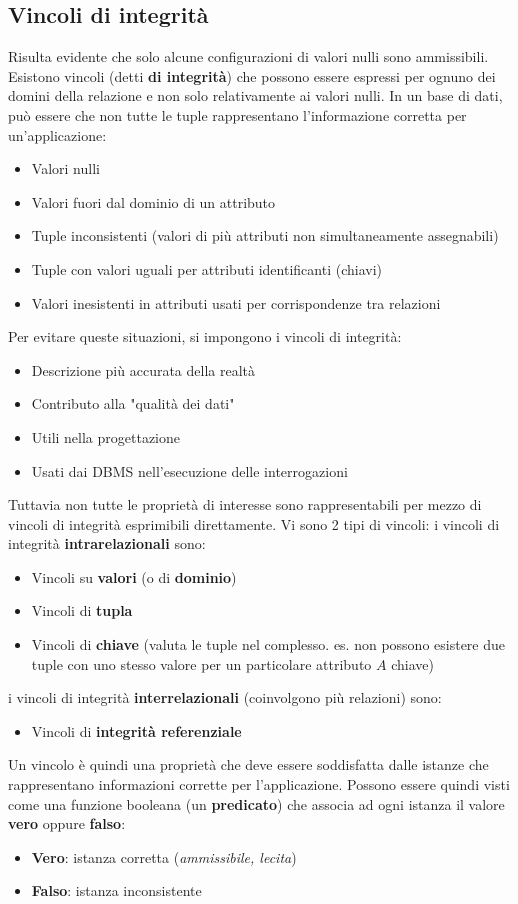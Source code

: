 \documentclass[12pt]{article}
\begin{document}
\subsection{Vincoli di integrità}
Risulta evidente che solo alcune configurazioni di valori nulli sono ammissibili.
Esistono vincoli (detti \textbf{di integrità}) che possono essere espressi per ognuno dei domini della relazione e non solo relativamente ai valori nulli.
In un base di dati, può essere che non tutte le tuple rappresentano l'informazione corretta per un'applicazione:
\begin{itemize}
    \item Valori nulli
    \item Valori fuori dal dominio di un attributo
    \item Tuple inconsistenti (valori di più attributi non simultaneamente assegnabili)
    \item Tuple con valori uguali per attributi identificanti (chiavi)
    \item Valori inesistenti in attributi usati per corrispondenze tra relazioni
\end{itemize}
Per evitare queste situazioni, si impongono i vincoli di integrità:
\begin{itemize}
    \item Descrizione più accurata della realtà 
    \item Contributo alla "qualità dei dati"
    \item Utili nella progettazione
    \item Usati dai DBMS nell'esecuzione delle interrogazioni
\end{itemize}
Tuttavia non tutte le proprietà di interesse sono rappresentabili per mezzo di vincoli di integrità esprimibili direttamente. \newline
Vi sono 2 tipi di vincoli: i vincoli di integrità \textbf{intrarelazionali} sono:
\begin{itemize}
    \item Vincoli su \textbf{valori} (o di \textbf{dominio})
    \item Vincoli di \textbf{tupla}
    \item Vincoli di \textbf{chiave} (valuta le tuple nel complesso. es. non possono esistere due tuple con uno stesso valore per un particolare attributo $A$ chiave)
\end{itemize}
i vincoli di integrità \textbf{interrelazionali} (coinvolgono più relazioni) sono:
\begin{itemize}
    \item Vincoli di \textbf{integrità referenziale}
\end{itemize} 
Un vincolo è quindi una proprietà che deve essere soddisfatta dalle istanze che rappresentano informazioni corrette per l'applicazione.
Possono essere quindi visti come una funzione booleana (un \textbf{predicato}) che associa ad ogni istanza il valore \textbf{vero} oppure \textbf{falso}:
\begin{itemize}
    \item \textbf{Vero}: istanza corretta (\textit{ammissibile, lecita})
    \item \textbf{Falso}: istanza inconsistente
\end{itemize}
\end{document}
